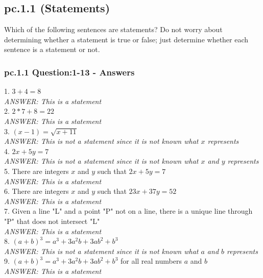 \subsection{pc.1.1 (Statements)}
Which of the following sentences are statements? 
Do not worry about determining whether a statement is true or false; just determine whether each sentence is a statement or not.

\subsubsection*{pc.1.1 Question:1-13 - Answers}


1. $3+4 = 8$ \\
{\it ANSWER: This is a statement} \\

2. $2*7 + 8 = 22$ \\
{\it ANSWER: This is a statement} \\

3. $(x-1)=\sqrt{x+11}$ \\
{\it ANSWER: This is not a statement since it is not known what $x$ represents} \\

4. $2x+5y=7$ \\
{\it ANSWER: This is not a statement since it is not known what $x$ and $y$ represents} \\

5. There are integers $x$ and $y$ such that $2x +5y =7$ \\
{\it ANSWER: This is a statement} \\

6. There are integers $x$ and $y$ such that $23x +37y =52$ \\
{\it ANSWER: This is a statement} \\

7. Given a line "L" and a point "P" not on a line, there is a unique line through "P" that does not intersect "L" \\
{\it ANSWER: This is a statement} \\

8. $(a+b)^3 = a^3 + 3a^2b + 3ab^2 + b^3$ \\
{\it ANSWER: This is not a statement since it is not known what $a$ and $b$ represents} \\

9. $(a+b)^3 = a^3 + 3a^2b + 3ab^2 + b^3$ for all real numbers $a$ and $b$\\
{\it ANSWER: This is a statement} \\

